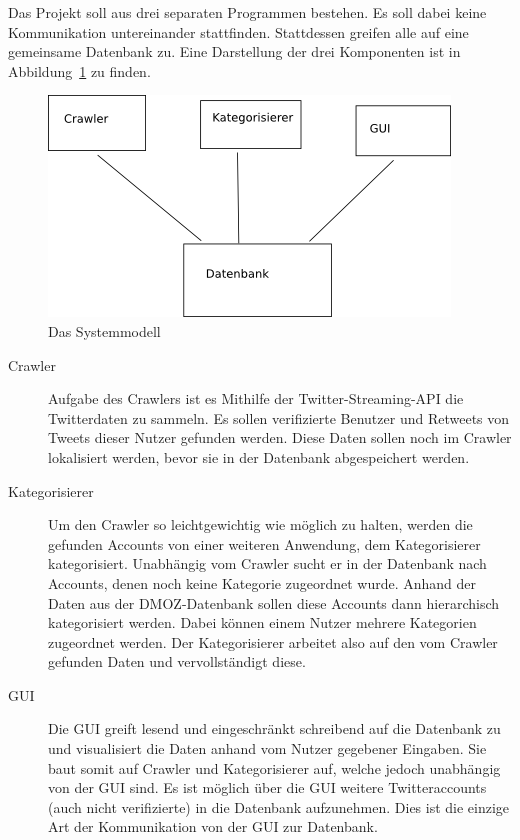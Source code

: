 
Das Projekt soll aus drei separaten Programmen bestehen. Es soll dabei keine Kommunikation untereinander stattfinden. Stattdessen greifen alle auf eine gemeinsame Datenbank zu. Eine Darstellung der drei Komponenten ist in Abbildung~\ref{c:systemmodell} zu finden.

\begin{figure}[h]
	\centering
	\includegraphics{img/systemmodell.png}
	\caption{Das Systemmodell}
	\label{c:systemmodell}
\end{figure}

\begin{description}
	\item[Crawler] Aufgabe des Crawlers ist es Mithilfe der Twitter-Streaming-API die Twitterdaten zu sammeln. Es sollen verifizierte Benutzer und Retweets von Tweets dieser Nutzer gefunden werden. Diese Daten sollen noch im Crawler lokalisiert werden, bevor sie in der Datenbank abgespeichert werden.
	\item[Kategorisierer] Um den Crawler so leichtgewichtig wie möglich zu halten, werden die gefunden Accounts von einer weiteren Anwendung, dem Kategorisierer kategorisiert. Unabhängig vom Crawler sucht er in der Datenbank nach Accounts, denen noch keine Kategorie zugeordnet wurde. Anhand der Daten aus der DMOZ-Datenbank sollen diese Accounts dann hierarchisch kategorisiert werden. Dabei können einem Nutzer mehrere Kategorien zugeordnet werden. Der Kategorisierer arbeitet also auf den vom Crawler gefunden Daten und vervollständigt diese.
	\item[GUI] Die GUI greift lesend und eingeschränkt schreibend auf die Datenbank zu und visualisiert die Daten anhand vom Nutzer gegebener Eingaben. Sie baut somit auf Crawler und Kategorisierer auf, welche jedoch unabhängig von der GUI sind. Es ist möglich über die GUI weitere Twitteraccounts (auch nicht verifizierte) in die Datenbank aufzunehmen. Dies ist die einzige Art der Kommunikation von der GUI zur Datenbank.
\end{description}


